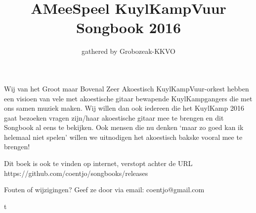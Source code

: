 \documentclass[a4,openany,landscape]{article}
\title{AMeeSpeel KuylKampVuur Songbook 2016}
\author{gathered by Grobozeak-KKVO}
\begin{document}

\maketitle
Wij van het Groot maar Bovenal Zeer Akoestisch KuylKampVuur-orkest hebben een visioen van vele met akoestische gitaar bewapende KuylKampgangers die met ons samen muziek maken. Wij willen dan ook iedereen die het KuylKamp 2016 gaat bezoeken vragen zijn/haar akoestische gitaar mee te brengen en dit Songbook al eens te bekijken. Ook mensen die nu denken `maar zo goed kan ik helemaal niet spelen' willen we uitnodigen het akoestisch bakske vooral mee te brengen! 


Dit boek is ook te vinden op internet, verstopt achter de URL 
https://github.com/coentjo/songbooks/releases

Fouten of wijzigingen? Geef ze door via email:  coentjo@gmail.com






\begin{songs}{} %



						
						
	
	
	
	
	
	
	
	
	
	
	
	
	
	
%	
	
	
	
	
t


%			
\end{songs}




\end{document}
